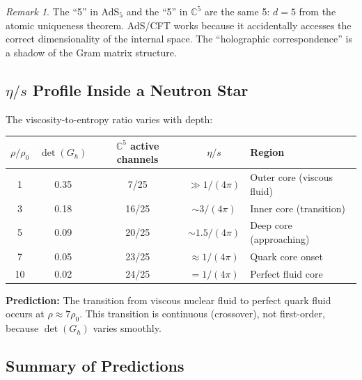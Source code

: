 \documentclass[12pt]{article}
\theoremstyle{remark}
\newtheorem{remark}[theorem]{Remark}
\theoremstyle{definition}
\newcommand{\CC}{\mathbb{C}}
\begin{document}
\begin{remark}
The ``5'' in AdS$_5$ and the ``5'' in $\CC^5$ are the same 5: $d = 5$ from the atomic uniqueness theorem. AdS/CFT works because it accidentally accesses the correct dimensionality of the internal space. The ``holographic correspondence'' is a shadow of the Gram matrix structure.
\end{remark}

\subsection{$\eta/s$ Profile Inside a Neutron Star}

The viscosity-to-entropy ratio varies with depth:

\begin{center}
\begin{tabular}{ccccl}
\hline
$\rho/\rho_0$ & $\det(G_h)$ & $\CC^5$ active channels & $\eta/s$ & Region \\
\hline
1 & 0.35 & 7/25 & $\gg 1/(4\pi)$ & Outer core (viscous fluid) \\
3 & 0.18 & 16/25 & $\sim 3/(4\pi)$ & Inner core (transition) \\
5 & 0.09 & 20/25 & $\sim 1.5/(4\pi)$ & Deep core (approaching) \\
7 & 0.05 & 23/25 & $\approx 1/(4\pi)$ & Quark core onset \\
10 & 0.02 & 24/25 & $= 1/(4\pi)$ & Perfect fluid core \\
\hline
\end{tabular}
\end{center}

\textbf{Prediction:} The transition from viscous nuclear fluid to perfect quark fluid occurs at $\rho \approx 7\rho_0$. This transition is continuous (crossover), not first-order, because $\det(G_h)$ varies smoothly.

\subsection{Summary of Predictions}
\end{document}
